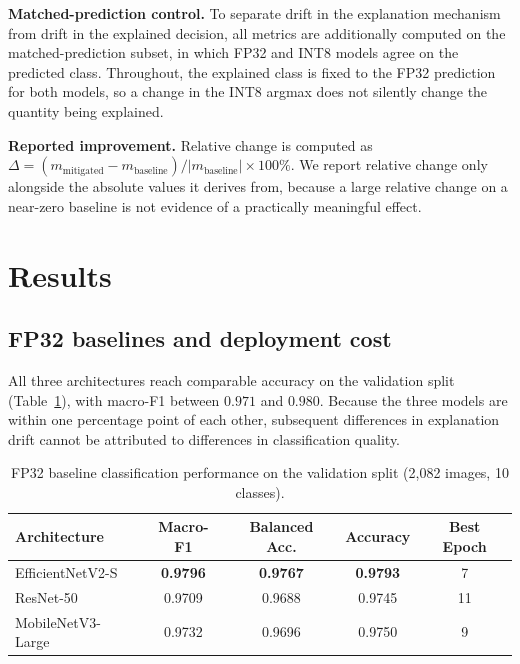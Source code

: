 \documentclass[fleqn,10pt]{wlscirep}
\begin{document}
\textbf{Matched-prediction control.} To separate drift in the explanation mechanism from drift in the explained decision, all metrics are additionally computed on the matched-prediction subset, in which FP32 and INT8 models agree on the predicted class. Throughout, the explained class is fixed to the FP32 prediction for both models, so a change in the INT8 argmax does not silently change the quantity being explained.

\textbf{Reported improvement.} Relative change is computed as $\Delta = (m_{\text{mitigated}} - m_{\text{baseline}}) / |m_{\text{baseline}}| \times 100\%$. We report relative change only alongside the absolute values it derives from, because a large relative change on a near-zero baseline is not evidence of a practically meaningful effect.


\section*{Results}

\subsection*{FP32 baselines and deployment cost}

All three architectures reach comparable accuracy on the validation split (Table~\ref{tab:fp32_baseline}), with macro-F1 between $0.971$ and $0.980$. Because the three models are within one percentage point of each other, subsequent differences in explanation drift cannot be attributed to differences in classification quality.

\begin{table}[!ht]
\centering
\caption{FP32 baseline classification performance on the validation split (2{,}082 images, 10 classes).}
\label{tab:fp32_baseline}
\begin{tabular}{lcccc}
\toprule
\textbf{Architecture} & \textbf{Macro-F1} & \textbf{Balanced Acc.} & \textbf{Accuracy} & \textbf{Best Epoch} \\
\midrule
EfficientNetV2-S  & \textbf{0.9796} & \textbf{0.9767} & \textbf{0.9793} & 7 \\
ResNet-50         & 0.9709 & 0.9688 & 0.9745 & 11 \\
MobileNetV3-Large & 0.9732 & 0.9696 & 0.9750 & 9 \\
\bottomrule
\end{tabular}
\end{table}
\end{document}
